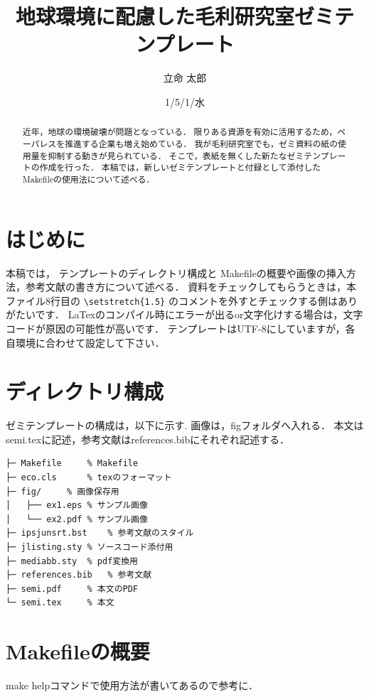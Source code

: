 \documentclass[submit,techreq,noauthor]{eco}	%
\begin{document}
\date   {1/5/1/水}				%
\title  {地球環境に配慮した毛利研究室ゼミテンプレート}	%
\author {立命 太郎}				%


\begin{abstract}
近年，地球の環境破壊が問題となっている．
限りある資源を有効に活用するため，ペーパレスを推進する企業も増え始めている．
我が毛利研究室でも，ゼミ資料の紙の使用量を抑制する動きが見られている．
そこで，表紙を無くした新たなゼミテンプレートの作成を行った．
本稿では，新しいゼミテンプレートと付録として添付したMakefileの使用法について述べる．
\end{abstract}
\maketitle

\section{はじめに}
本稿では，
テンプレートのディレクトリ構成と
Makefileの概要や画像の挿入方法，参考文献の書き方について述べる．
資料をチェックしてもらうときは，本ファイル8行目の
\verb|\setstretch{1.5}|
のコメントを外すとチェックする側はありがたいです．
LaTexのコンパイル時にエラーが出るor文字化けする場合は，文字コードが原因の可能性が高いです．
テンプレートはUTF-8にしていますが，各自環境に合わせて設定して下さい．


\section{ディレクトリ構成}
ゼミテンプレートの構成は，以下に示す.
画像は，figフォルダへ入れる．
本文はsemi.texに記述，参考文献はreferences.bibにそれぞれ記述する．

\begin{lstlisting}
├─ Makefile		% Makefile
├─ eco.cls		% texのフォーマット
├─ fig/		% 画像保存用
│   ├── ex1.eps	% サンプル画像
│   └── ex2.pdf	% サンプル画像
├─ ipsjunsrt.bst	% 参考文献のスタイル
├─ jlisting.sty	% ソースコード添付用
├─ mediabb.sty 	% pdf変換用
├─ references.bib	% 参考文献
├─ semi.pdf		% 本文のPDF
└─ semi.tex		% 本文
\end{lstlisting}

\section{Makefileの概要}
make helpコマンドで使用方法が書いてあるので参考に．
\end{document}
